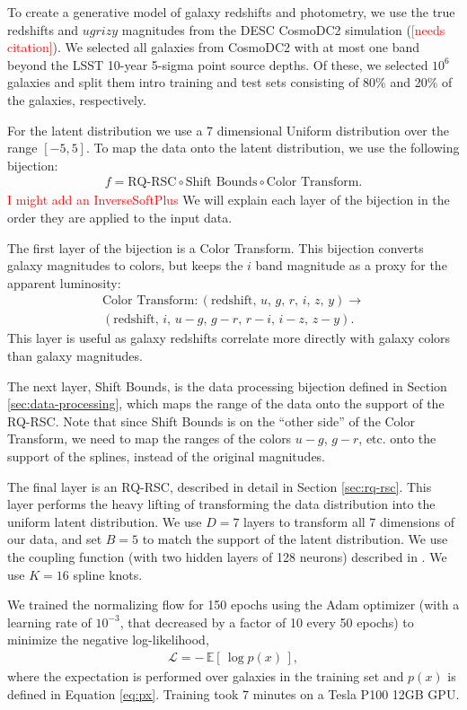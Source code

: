 \documentclass[twocolumn]{aastex631}
\newcommand{\note}[1]{\textsf{\textcolor{red}{#1}}}
\newcommand{\needscite}{\note{[needs citation]}}
\begin{document}
To create a generative model of galaxy redshifts and photometry, we use the true redshifts and $ugrizy$ magnitudes from the DESC CosmoDC2 simulation (\needscite).
We selected all galaxies from CosmoDC2 with at most one band beyond the LSST 10-year 5-sigma point source depths.
Of these, we selected $10^6$ galaxies and split them intro training and test sets consisting of 80\% and 20\% of the galaxies, respectively.

For the latent distribution we use a 7 dimensional Uniform distribution over the range $[-5, 5]$.
To map the data onto the latent distribution, we use the following bijection:
\begin{align}
    f = \text{RQ-RSC} \circ \text{Shift Bounds} \circ \text{Color Transform}.
\end{align}
\note{I might add an InverseSoftPlus}
We will explain each layer of the bijection in the order they are applied to the input data.

The first layer of the bijection is a Color Transform.
This bijection converts galaxy magnitudes to colors, but keeps the $i$ band magnitude as a proxy for the apparent luminosity:
\begin{multline}
    \text{Color Transform} : (\text{redshift},\, u,\, g,\, r,\, i,\, z,\, y) \to \\
    (\text{redshift},\, i,\, u-g,\, g-r,\, r-i,\, i-z,\, z-y).
\end{multline}
This layer is useful as galaxy redshifts correlate more directly with galaxy colors than galaxy magnitudes.

The next layer, Shift Bounds, is the data processing bijection defined in Section \ref{sec:data-processing}, which maps the range of the data onto the support of the RQ-RSC.
Note that since Shift Bounds is on the ``other side'' of the Color Transform, we need to map the ranges of the colors $u-g$, $g-r$, etc. onto the support of the splines, instead of the original magnitudes.

The final layer is an RQ-RSC, described in detail in Section \ref{sec:rq-rsc}.
This layer performs the heavy lifting of transforming the data distribution into the uniform latent distribution.
We use $D=7$ layers to transform all 7 dimensions of our data, and set $B=5$ to match the support of the latent distribution.
We use the coupling function (with two hidden layers of 128 neurons) described in \citet{durkan2019}.
We use $K=16$ spline knots.

We trained the normalizing flow for 150 epochs using the Adam optimizer \citep{adam} (with a learning rate of $10^{-3}$, that decreased by a factor of 10 every 50 epochs) to minimize the negative log-likelihood,
\begin{align}
    \mathcal{L} = - \, \mathbb{E}[ \, \log p(x) \, ],
\end{align}
where the expectation is performed over galaxies in the training set and $p(x)$ is defined in Equation \ref{eq:px}.
Training took 7 minutes on a Tesla P100 12GB GPU.
\end{document}
